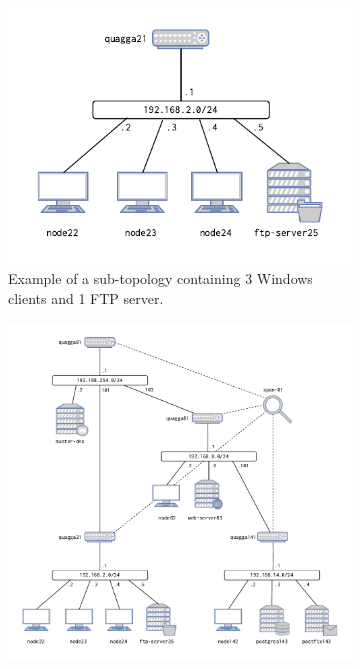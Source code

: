 \begin{figure}[t]
  \centering
  \begin{subfigure}[b]{0.34\linewidth}
    \centering
    \includegraphics[width=\linewidth]{figures/sub_topology.pdf}
    \caption{
      Example of a sub-topology containing 3 Windows clients and 1 FTP server.
      \label{fig:topologies.example}
    }
  \end{subfigure}
  \hfill
  \begin{subfigure}[b]{0.64\linewidth}
    \centering
    \includegraphics[width=\linewidth]{figures/topology.pdf}

\end{subfigure}
\end{figure}
